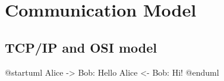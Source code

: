 \documentclass[main.tex]{subfiles}
\begin{document}
    \chapter{Communication Model}
    \section{TCP/IP and OSI model}

\begin{plantuml}
  @startuml
  Alice -> Bob: Hello
  Alice <- Bob: Hi!
  @enduml
\end{plantuml}
\end{document}
